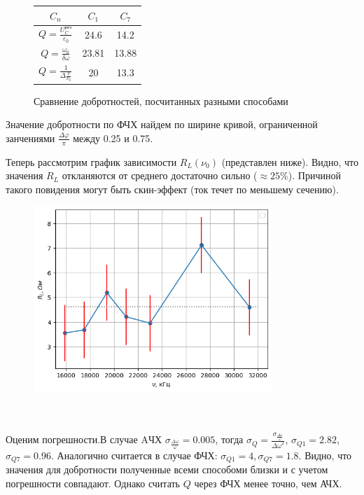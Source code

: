 \begin{figure}
        \centering
        \begin{tabular}{|c|c|c|}
            \hline
            $C_n$ & $C_1$ & $C_7$ \\\hline
            $Q = \frac{U_C^{ \text{рез}}}{\varepsilon_0}$ & 24.6 & 14.2 \\\hline
            $Q = \frac{\omega_0}{\delta \omega}$& 23.81 & 13.88 \\\hline
            $Q = \frac{1}{\Delta \frac{\nu}{\nu_0}}$& 20 & 13.3 \\\hline
        \end{tabular}
        \caption{Сравнение добротностей, посчитанных разными способами}
\end{figure}
Значение добротности по ФЧХ найдем по ширине кривой, ограниченной занчениями $\frac{\Delta \varphi}{\pi}$ между 0.25 и 0.75.

Теперь рассмотрим график зависимости $R_L(\nu_0)$ (представлен ниже). Видно, что значения $R_L$ откланяются от среднего достаточно сильно ($\approx 25\%$). Причиной такого повидения могут быть скин-эффект (ток течет по меньшему сечению). 
\\
\begin{figure}
    \centering
    \includegraphics[width=9cm]{./images/plot4.png}
\end{figure}

\\\\Оценим погрешности.В случае AЧХ $\sigma_{\frac{\Delta \omega}{\omega}} = 0.005$, тогда $\sigma_Q = \frac{\sigma_{\frac{\Delta \omega}{\omega}}}{{\Delta \omega}^2}$, $\sigma_{Q1} = 2.82$, $\sigma_{Q7} = 0.96$.
Аналогично считается в случае ФЧХ: $\sigma_{Q1} = 4, \sigma_{Q7} = 1.8$.
Видно, что значения для добротности полученные всеми способоми близки и с учетом погрешности совпадают. 
Однако считать $Q$ через ФЧХ менее точно, чем АЧХ.






